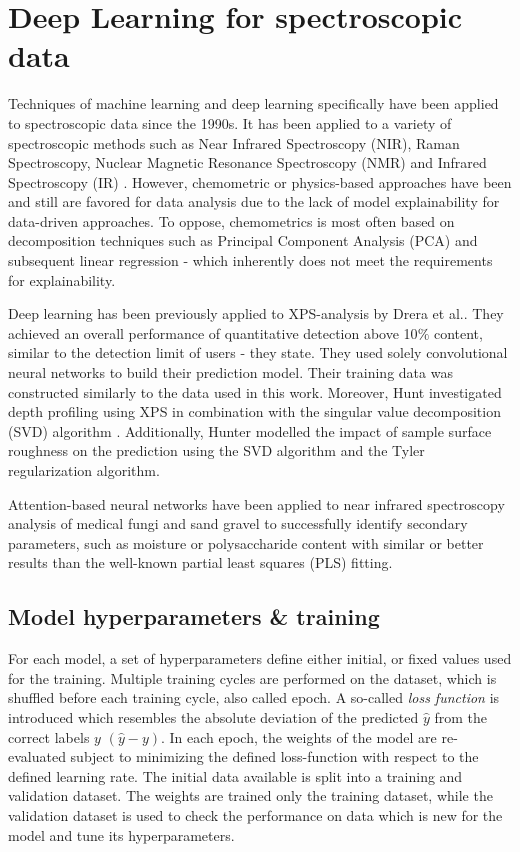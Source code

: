 \label{DL_theory}
\section{Deep Learning for spectroscopic data}

Techniques of machine learning and deep learning specifically have been applied to spectroscopic data since the 1990s. It has been applied to a variety of spectroscopic methods such as Near Infrared Spectroscopy (NIR), Raman Spectroscopy, Nuclear Magnetic Resonance Spectroscopy (NMR) and Infrared Spectroscopy (IR) . However, chemometric or physics-based approaches have been and still are favored for data analysis due to the lack of model explainability for data-driven approaches. To oppose, chemometrics is most often based on decomposition techniques such as Principal Component Analysis (PCA) and subsequent linear regression - which inherently does not meet the requirements for explainability.

Deep learning has been previously applied to XPS-analysis by Drera et al.\cite{drera_deep_2019}. They achieved an overall performance of quantitative detection above 10$\%$ content, similar to the detection limit of users - they state. They used solely convolutional neural networks to build their prediction model. Their training data was constructed similarly to the data used in this work. Moreover, Hunt investigated depth profiling using XPS in combination with the singular value decomposition (SVD) algorithm \cite{hunt_depth_2000}. Additionally, Hunter modelled the impact of sample surface roughness on the prediction using the SVD algorithm and the Tyler regularization algorithm.

Attention-based neural networks have been applied to near infrared spectroscopy analysis of medical fungi \cite{huang_attention_2019} and sand gravel \cite{yuan_hybrid_2022} to successfully identify secondary parameters, such as moisture or polysaccharide content with similar or better results than the well-known partial least squares (PLS) fitting.

\subsection{Model hyperparameters \& training}
For each model, a set of hyperparameters define either initial, or fixed values used for the training. 
Multiple training cycles are performed on the dataset, which is shuffled before each training cycle, also called epoch. A so-called \emph{loss function} is introduced which resembles the absolute deviation of the predicted $\hat{y}$ from the correct labels $y$ $(\hat{y} - y)$.
In each epoch, the weights of the model are re-evaluated subject to minimizing the defined loss-function with respect to the defined learning rate. The initial data available is split into a training and validation dataset. The weights are trained only the training dataset, while the validation dataset is used to check the performance on data which is new for the model and tune its hyperparameters. 

